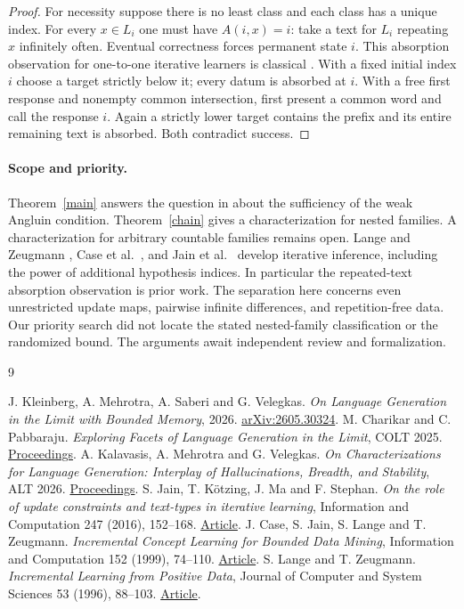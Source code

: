 \documentclass[11pt]{article}
\begin{document}
\begin{proof}
For necessity suppose there is no least class and each class has a unique index. For every $x\in L_i$ one must have $A(i,x)=i$: take a text for $L_i$ repeating $x$ infinitely often. Eventual correctness forces permanent state $i$. This absorption observation for one-to-one iterative learners is classical \cite[Lemma 22]{jain}. With a fixed initial index $i$ choose a target strictly below it; every datum is absorbed at $i$. With a free first response and nonempty common intersection, first present a common word and call the response $i$. Again a strictly lower target contains the prefix and its entire remaining text is absorbed. Both contradict success.
\end{proof}

\paragraph{Scope and priority.}
Theorem~\ref{main} answers the question in \cite[Section 1.3]{bounded} about the sufficiency of the weak Angluin condition. Theorem~\ref{chain} gives a characterization for nested families. A characterization for arbitrary countable families remains open. Lange and Zeugmann \cite{lange}, Case et al.\ \cite{case}, and Jain et al.\ \cite{jain} develop iterative inference, including the power of additional hypothesis indices. In particular the repeated-text absorption observation is prior work. The separation here concerns even unrestricted update maps, pairwise infinite differences, and repetition-free data. Our priority search did not locate the stated nested-family classification or the randomized bound. The arguments await independent review and formalization.

\begin{thebibliography}{9}\small\raggedright
{} J. Kleinberg, A. Mehrotra, A. Saberi and G. Velegkas. \emph{On Language Generation in the Limit with Bounded Memory}, 2026. \href{https://arxiv.org/abs/2605.30324}{arXiv:2605.30324}.
 M. Charikar and C. Pabbaraju. \emph{Exploring Facets of Language Generation in the Limit}, COLT 2025. \href{https://proceedings.mlr.press/v291/charikar25a.html}{Proceedings}.
 A. Kalavasis, A. Mehrotra and G. Velegkas. \emph{On Characterizations for Language Generation: Interplay of Hallucinations, Breadth, and Stability}, ALT 2026. \href{https://proceedings.mlr.press/v313/kalavasis26a.html}{Proceedings}.
 S. Jain, T. K\"otzing, J. Ma and F. Stephan. \emph{On the role of update constraints and text-types in iterative learning}, Information and Computation 247 (2016), 152--168. \href{https://hpi.de/friedrich/docs/publications/2016/InCo_b.pdf}{Article}.
 J. Case, S. Jain, S. Lange and T. Zeugmann. \emph{Incremental Concept Learning for Bounded Data Mining}, Information and Computation 152 (1999), 74--110. \href{https://doi.org/10.1006/inco.1998.2784}{Article}.
 S. Lange and T. Zeugmann. \emph{Incremental Learning from Positive Data}, Journal of Computer and System Sciences 53 (1996), 88--103. \href{https://doi.org/10.1006/jcss.1996.0051}{Article}.
\end{thebibliography}
\end{document}
